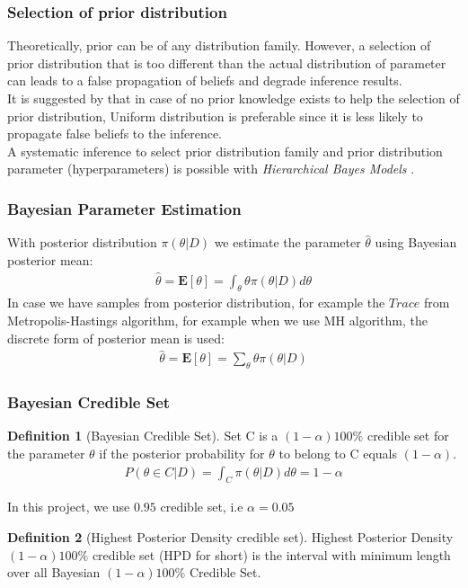 \documentclass[12pt]{article}
\theoremstyle{definition}
\newtheorem{definition}{Definition}[section]
\begin{document}
\subsubsection{Selection of prior distribution}
Theoretically, prior can be of any distribution family. However, a selection of
prior distribution that is too different than the actual distribution of
parameter can leads to a false propagation of beliefs and degrade inference
results.\\
It is suggested by \cite{polgreen2016data} that in case of no prior knowledge
exists to help the selection of prior distribution, Uniform distribution is
preferable since it is less likely to propagate false beliefs to the
inference.\\
A systematic inference to select prior distribution family and prior
distribution parameter (hyperparameters) is possible with \textit{Hierarchical
  Bayes Models} \cite{allenby2005hierarchical}.


\subsubsection{Bayesian Parameter Estimation}
With posterior distribution $\pi(\theta|D)$ we estimate the parameter
$\hat{\theta}$ using Bayesian posterior mean:
\begin{align*}
  \hat{\theta} = \mathbf{E}[\theta] = \int_\theta \theta \pi(\theta|D) d\theta
\end{align*}
In case we have samples from posterior distribution, for example the $Trace$
from Metropolis-Hastings algorithm, for example when we use MH algorithm, the
discrete form of posterior mean is used: 
\begin{align*}
  \hat{\theta} = \mathbf{E}[\theta] = \sum_\theta \theta \pi(\theta|D)
\end{align*}


\subsubsection{Bayesian Credible Set}
\begin{definition}[Bayesian Credible Set]
  Set C is a $(1 − \alpha )100\%$ credible set for the parameter $\theta$ if the posterior
  probability for $\theta$ to belong to C equals $(1 − \alpha)$.
  \begin{align*}
    P(\theta \in C | D) = \int_C \pi(\theta|D) d\theta = 1 - \alpha
  \end{align*}
\end{definition}
In this project, we use $0.95$ credible set, i.e $\alpha=0.05$
\begin{definition}[Highest Posterior Density credible set]
  Highest Posterior Density $(1-\alpha)100\%$ credible set (HPD for short) is the
  interval with minimum length over all Bayesian $(1-\alpha)100\%$ Credible Set.
\end{definition}
\end{document}
